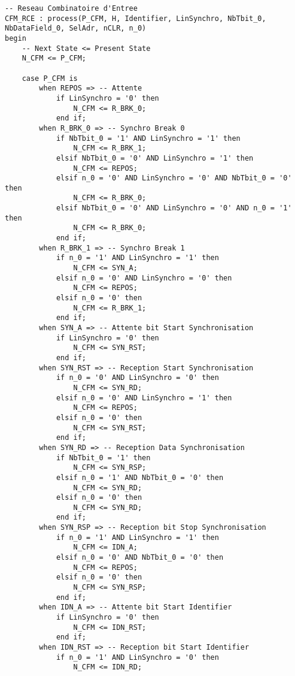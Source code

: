 \begin{lstlisting}[style=VHDLStyle, caption={Réseau Combinatoire d’Entrée Reception Trame}]
-- Reseau Combinatoire d'Entree
CFM_RCE : process(P_CFM, H, Identifier, LinSynchro, NbTbit_0, NbDataField_0, SelAdr, nCLR, n_0)
begin
    -- Next State <= Present State
    N_CFM <= P_CFM;

    case P_CFM is
        when REPOS => -- Attente
            if LinSynchro = '0' then
                N_CFM <= R_BRK_0;
            end if;
        when R_BRK_0 => -- Synchro Break 0
            if NbTbit_0 = '1' AND LinSynchro = '1' then
                N_CFM <= R_BRK_1;
            elsif NbTbit_0 = '0' AND LinSynchro = '1' then
                N_CFM <= REPOS;
            elsif n_0 = '0' AND LinSynchro = '0' AND NbTbit_0 = '0' then
                N_CFM <= R_BRK_0;
            elsif NbTbit_0 = '0' AND LinSynchro = '0' AND n_0 = '1' then
                N_CFM <= R_BRK_0;
            end if;
        when R_BRK_1 => -- Synchro Break 1
            if n_0 = '1' AND LinSynchro = '1' then
                N_CFM <= SYN_A;
            elsif n_0 = '0' AND LinSynchro = '0' then
                N_CFM <= REPOS;
            elsif n_0 = '0' then
                N_CFM <= R_BRK_1;
            end if;
        when SYN_A => -- Attente bit Start Synchronisation
            if LinSynchro = '0' then
                N_CFM <= SYN_RST;
            end if;
        when SYN_RST => -- Reception Start Synchronisation
            if n_0 = '0' AND LinSynchro = '0' then
                N_CFM <= SYN_RD;
            elsif n_0 = '0' AND LinSynchro = '1' then
                N_CFM <= REPOS;
            elsif n_0 = '0' then
                N_CFM <= SYN_RST;
            end if;
        when SYN_RD => -- Reception Data Synchronisation
            if NbTbit_0 = '1' then
                N_CFM <= SYN_RSP;
            elsif n_0 = '1' AND NbTbit_0 = '0' then
                N_CFM <= SYN_RD;
            elsif n_0 = '0' then
                N_CFM <= SYN_RD;
            end if;
        when SYN_RSP => -- Reception bit Stop Synchronisation
            if n_0 = '1' AND LinSynchro = '1' then
                N_CFM <= IDN_A;
            elsif n_0 = '0' AND NbTbit_0 = '0' then
                N_CFM <= REPOS;
            elsif n_0 = '0' then
                N_CFM <= SYN_RSP;
            end if;
        when IDN_A => -- Attente bit Start Identifier
            if LinSynchro = '0' then
                N_CFM <= IDN_RST;
            end if;
        when IDN_RST => -- Reception bit Start Identifier
            if n_0 = '1' AND LinSynchro = '0' then
                N_CFM <= IDN_RD;

\end{lstlisting}
